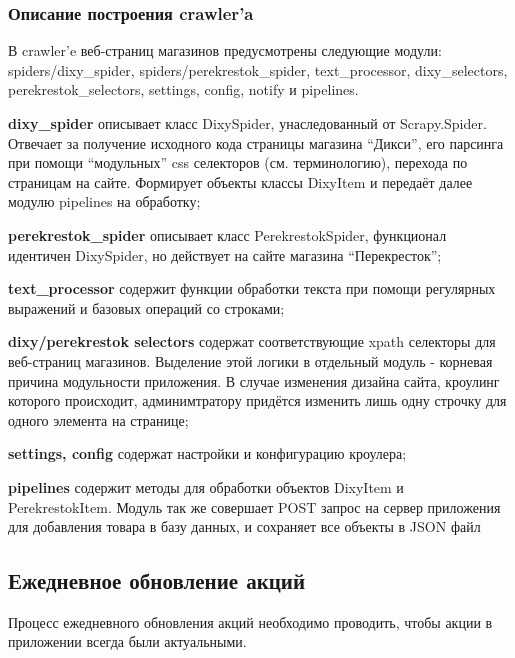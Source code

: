 \subsubsection{Описание построения crawler'a}

В crawler'e веб-страниц магазинов предусмотрены следующие модули:
spiders/dixy\_spider, spiders/perekrestok\_spider, text\_processor,
dixy\_selectors, perekrestok\_selectors, settings, config, notify и pipelines.\\
\begin{my_enumerate}
    \item \textbf{dixy\_spider} описывает класс DixySpider, унаследованный от
        Scrapy.Spider. Отвечает за получение исходного кода страницы магазина
        ``Дикси'', его парсинга при помощи ``модульных'' css селекторов (см.
        терминологию), перехода по страницам на сайте. Формирует объекты классы
        DixyItem и передаёт далее модулю pipelines на обработку;
    \item \textbf{perekrestok\_spider} описывает класс PerekrestokSpider,
        функционал идентичен DixySpider, но действует на сайте магазина
        ``Перекресток'';
    \item \textbf{text\_processor} содержит функции обработки текста при помощи
        регулярных выражений и базовых операций со строками;
    \item \textbf{dixy/perekrestok selectors} содержат соответствующие xpath
        селекторы для веб-страниц магазинов. Выделение этой логики в отдельный
        модуль - корневая причина модульности приложения. В случае изменения
        дизайна сайта, кроулинг которого происходит, админимтратору придётся
        изменить лишь одну строчку для одного элемента на странице;
    \item \textbf{settings, config} содержат настройки и конфигурацию кроулера;
    \item \textbf{pipelines} содержит методы для обработки объектов DixyItem и
        PerekrestokItem. Модуль так же совершает POST запрос на сервер
        приложения для добавления товара в базу данных, и сохраняет все объекты
        в JSON файл
\end{my_enumerate}

\subsection{Ежедневное обновление акций}
Процесс ежедневного обновления акций необходимо проводить, чтобы акции в приложении всегда были актуальными.

